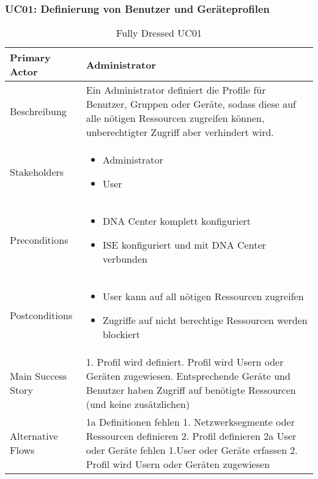 \subsubsection{UC01: Definierung von Benutzer und Geräteprofilen }
\begin{table}[H]
	\centering
	\begin{tabularx}{\textwidth}{l | X}
		Primary Actor      & Administrator        \\
		\hline
		Beschreibung       & Ein Administrator definiert die Profile für Benutzer, Gruppen oder Geräte, sodass diese auf alle nötigen Ressourcen zugreifen können, unberechtigter Zugriff aber verhindert wird. \\ 
		\hline
		Stakeholders       &  
		\begin{itemize}	
			\item Administrator
			\item User
		\end{itemize}              \\
		\hline
		Preconditions      & 
		\begin{itemize}	
			\item DNA Center komplett konfiguriert
			\item ISE konfiguriert und mit DNA Center verbunden
		\end{itemize}  \\
		\hline
		Postconditions     & 
		\begin{itemize}	
			\item User kann auf all nötigen Ressourcen zugreifen
			\item Zugriffe auf nicht berechtige Ressourcen werden blockiert
		\end{itemize}  \\
		\hline
		Main Success Story & 
		1.  Profil wird definiert\newline
		2.  Profil wird Usern oder Geräten zugewiesen\newline
		3.  Entsprechende Geräte und Benutzer haben Zugriff auf benötigte Ressourcen (und keine zusätzlichen)\newline
		\\
		\hline
		Alternative Flows  & 
		1a Definitionen fehlen \newline
		\noindent\hspace*{6mm} 1. Netzwerksegmente oder Ressourcen definieren \newline
		\noindent\hspace*{6mm} 2. Profil definieren
		\newline
		2a User oder Geräte fehlen \newline
		\noindent\hspace*{6mm} 1.User oder Geräte erfassen \newline
		\noindent\hspace*{6mm} 2. Profil wird Usern oder Geräten zugewiesen
	\end{tabularx}
	\caption{Fully Dressed UC01}
	\label{tab:UC02}
\end{table}
